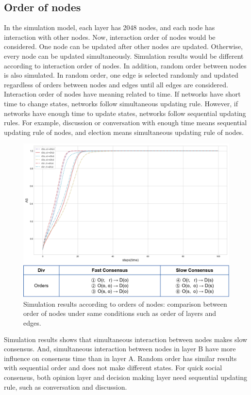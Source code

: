 \subsection{Order of nodes}
In the simulation model, each layer has 2048 nodes, and each node has interaction with other nodes. Now, interaction order of nodes would be considered. One node can be updated after other nodes are updated. Otherwise, every node can be updated simultaneously. Simulation results would be different according to interaction order of nodes. In addition, random order between nodes is also simulated. In random order, one edge is selected randomly and updated regardless of orders between nodes and edges until all edges are considered. Interaction order of nodes have meaning related to time. If networks have short time to change states, networks follow simultaneous updating rule. However, if networks have enough time to update states, networks follow sequential updating rules. For example, discussion or conversation with enough time means sequential updating rule of nodes, and election means simultaneous updating rule of nodes. 

\begin{figure}[!htb]
	\centering
	\includegraphics[width=\hsize]{figure/nodeorder.png}
	\caption{Simulation results according to orders of nodes: comparison between order of nodes under same conditions such as order of layers and edges.}
	\label{nodeorder}
\end{figure}

Simulation results shows that simultaneous interaction between nodes makes slow consensus. And, simultaneous interaction between nodes in layer B have more influence on consensus time than in layer A. Random order has similar results with sequential order and does not make different states. For quick social consensus, both opinion layer and decision making layer need sequential updating rule, such as conversation and discussion.      

